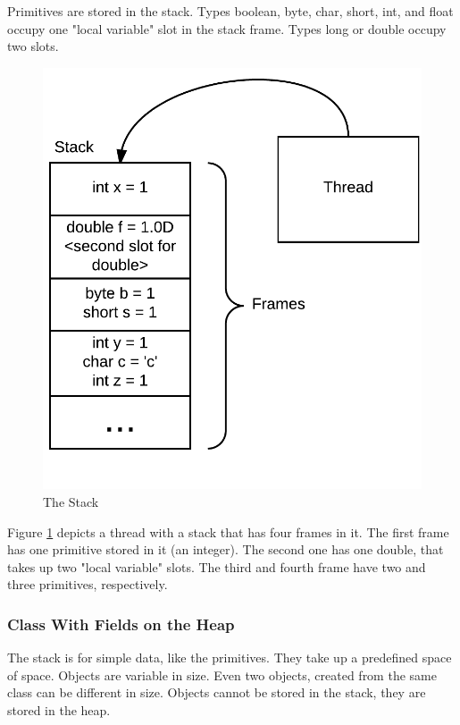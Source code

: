 Primitives are stored in the stack. Types boolean, byte, char, short, int, and float occupy one "local variable" slot in the stack frame. Types long or double occupy two slots. \cite{gosling}
\begin{figure}[H]\centering
\includegraphics[width=0.9\linewidth]{images/stack}
\caption{The Stack}
\label{fig:stack}
\end{figure}
Figure \ref{fig:stack} depicts a thread with a stack that has four frames in it. The first frame has one primitive stored in it (an integer). The second one has one double, that takes up two "local variable" slots. The third and fourth frame have two and three primitives, respectively.

\subsubsection{Class With Fields on the Heap}
The stack is for simple data, like the primitives. They take up a predefined space of space. Objects are variable in size. Even two objects, created from the same class can be different in size. Objects cannot be stored in the stack, they are stored in the heap.

